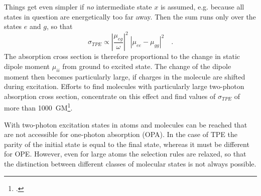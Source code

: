 Things get even simpler if 
\emph{no} intermediate state $x$ is assumed, e.g. because all states in
question are energetically too far away. Then the
sum runs only over the states $e$ and $g$, so that
\begin{equation}
\sigma_{TPE} \propto \left| \frac{\mu_{eg}}{\omega} \right|^2 \;
\left| \mu_{ee} -  \mu_{gg} \right|^2 \quad .
\end{equation}
The absorption cross section is therefore proportional to the change in
static dipole moment $\mu_{ii}$ from ground to excited
state. The change of the dipole moment then becomes particularly large,
if charges in the molecule are shifted during excitation.
Efforts to find molecules with particularly large
two-photon absorption cross section,
concentrate on this effect and find values of  $\sigma_{TPE}$ of more than 1000~GM\footcite{albota98}.

 

%


With two-photon excitation 
states in atoms and molecules can be reached that are not accessible for
 one-photon absorption (OPA).
In the case of TPE  the parity of the
initial state is equal to the final state, whereas it
must be different for OPE.  However, even for
large atoms the selection rules are relaxed, so that the distinction between
different classes of molecular states is not always
 possible. 
 
